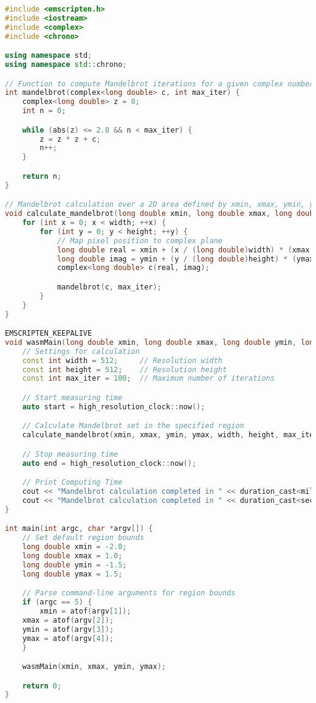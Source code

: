 \begin{lstlisting}[language=C++, frame=tb, caption={Mandelbrot Set Calculation (WASM build)}]
#include <emscripten.h>
#include <iostream>
#include <complex>
#include <chrono>

using namespace std;
using namespace std::chrono;

// Function to compute Mandelbrot iterations for a given complex number
int mandelbrot(complex<long double> c, int max_iter) {
    complex<long double> z = 0;
    int n = 0;

    while (abs(z) <= 2.0 && n < max_iter) {
        z = z * z + c;
        n++;
    }

    return n;
}

// Mandelbrot calculation over a 2D area defined by xmin, xmax, ymin, ymax
void calculate_mandelbrot(long double xmin, long double xmax, long double ymin, long double ymax, int width, int height, int max_iter) {
    for (int x = 0; x < width; ++x) {
        for (int y = 0; y < height; ++y) {
            // Map pixel position to complex plane
            long double real = xmin + (x / (long double)width) * (xmax - xmin);
            long double imag = ymin + (y / (long double)height) * (ymax - ymin);
            complex<long double> c(real, imag);

            mandelbrot(c, max_iter);
        }
    }
}

EMSCRIPTEN_KEEPALIVE
void wasmMain(long double xmin, long double xmax, long double ymin, long double ymax) {
    // Settings for calculation
    const int width = 512;     // Resolution width
    const int height = 512;    // Resolution height
    const int max_iter = 100;  // Maximum number of iterations

    // Start measuring time
    auto start = high_resolution_clock::now();

    // Calculate Mandelbrot set in the specified region
    calculate_mandelbrot(xmin, xmax, ymin, ymax, width, height, max_iter);

    // Stop measuring time
    auto end = high_resolution_clock::now();

    // Print Computing Time
    cout << "Mandelbrot calculation completed in " << duration_cast<milliseconds>(end - start).count() << "[ms]" << endl;
    cout << "Mandelbrot calculation completed in " << duration_cast<seconds>(end - start).count() << "[s]" << endl;
}

int main(int argc, char *argv[]) {
    // Set default region bounds
    long double xmin = -2.0;
    long double xmax = 1.0;
    long double ymin = -1.5;
    long double ymax = 1.5;

    // Parse command-line arguments for region bounds
    if (argc == 5) {
        xmin = atof(argv[1]);
	xmax = atof(argv[2]);
	ymin = atof(argv[3]);
	ymax = atof(argv[4]);
    }

    wasmMain(xmin, xmax, ymin, ymax);

    return 0;
}
\end{lstlisting}

